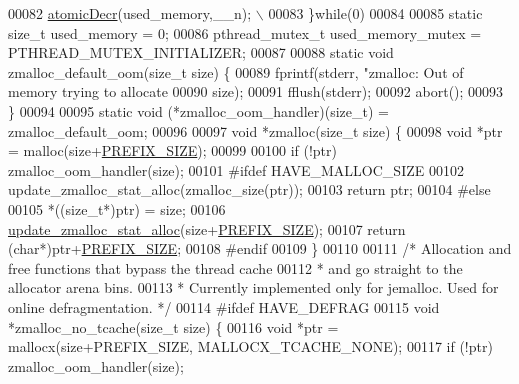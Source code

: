 \begin{DoxyCode}
00082     \hyperlink{atomicvar_8h_ab416a5857f1cf1a6dee0310c39ea2036}{atomicDecr}\textcolor{preprocessor}{(}\textcolor{preprocessor}{used\_memory}\textcolor{preprocessor}{,}\textcolor{preprocessor}{\_\_n}\textcolor{preprocessor}{)}\textcolor{preprocessor}{;} \textcolor{preprocessor}{\(\backslash\)}
00083 \textcolor{preprocessor}{\}}\textcolor{keywordflow}{while}\textcolor{preprocessor}{(}0\textcolor{preprocessor}{)}
00084 
00085 \textcolor{keyword}{static} size\_t used\_memory = 0;
00086 pthread\_mutex\_t used\_memory\_mutex = PTHREAD\_MUTEX\_INITIALIZER;
00087 
00088 \textcolor{keyword}{static} \textcolor{keywordtype}{void} zmalloc\_default\_oom(size\_t size) \{
00089     fprintf(stderr, \textcolor{stringliteral}{"zmalloc: Out of memory trying to allocate %
00090         size);
00091     fflush(stderr);
00092     abort();
00093 \}
00094 
00095 \textcolor{keyword}{static} \textcolor{keywordtype}{void} (*zmalloc\_oom\_handler)(size\_t) = zmalloc\_default\_oom;
00096 
00097 \textcolor{keywordtype}{void} *zmalloc(size\_t size) \{
00098     \textcolor{keywordtype}{void} *ptr = malloc(size+\hyperlink{zmalloc_8c_abe208177340b58cb5096daabe07922d1}{PREFIX\_SIZE});
00099 
00100     \textcolor{keywordflow}{if} (!ptr) zmalloc\_oom\_handler(size);
00101 \textcolor{preprocessor}{#}\textcolor{preprocessor}{ifdef} \textcolor{preprocessor}{HAVE\_MALLOC\_SIZE}
00102     update\_zmalloc\_stat\_alloc(zmalloc\_size(ptr));
00103     \textcolor{keywordflow}{return} ptr;
00104 \textcolor{preprocessor}{#}\textcolor{preprocessor}{else}
00105     *((size\_t*)ptr) = size;
00106     \hyperlink{zmalloc_8c_adc62adb8ec66924b8eaf16c123e1eb9c}{update\_zmalloc\_stat\_alloc}(size+\hyperlink{zmalloc_8c_abe208177340b58cb5096daabe07922d1}{PREFIX\_SIZE});
00107     \textcolor{keywordflow}{return} (\textcolor{keywordtype}{char}*)ptr+\hyperlink{zmalloc_8c_abe208177340b58cb5096daabe07922d1}{PREFIX\_SIZE};
00108 \textcolor{preprocessor}{#}\textcolor{preprocessor}{endif}
00109 \}
00110 
00111 \textcolor{comment}{/* Allocation and free functions that bypass the thread cache}
00112 \textcolor{comment}{ * and go straight to the allocator arena bins.}
00113 \textcolor{comment}{ * Currently implemented only for jemalloc. Used for online defragmentation. */}
00114 \textcolor{preprocessor}{#}\textcolor{preprocessor}{ifdef} \textcolor{preprocessor}{HAVE\_DEFRAG}
00115 \textcolor{keywordtype}{void} *zmalloc\_no\_tcache(size\_t size) \{
00116     \textcolor{keywordtype}{void} *ptr = mallocx(size+PREFIX\_SIZE, MALLOCX\_TCACHE\_NONE);
00117     \textcolor{keywordflow}{if} (!ptr) zmalloc\_oom\_handler(size);
}
\end{DoxyCode}

